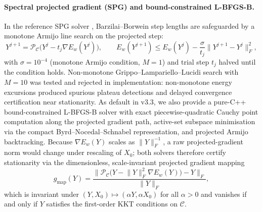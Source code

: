 \documentclass[11pt]{article}
\theoremstyle{definition}
\newcommand{\Fnorm}[1]{\lVert #1 \rVert_F}
\begin{document}
\paragraph{Spectral projected gradient (SPG) and bound-constrained L-BFGS-B.}
In the reference SPG solver \citep{birgin2000}, Barzilai--Borwein step lengths
\citep{barzilai1988} are safeguarded by a monotone Armijo line search on the projected step:
\begin{equation}\label{eq:spg_armijo}
  Y^{j+1} = \mathcal{P}_\mathcal{C}\!\big(Y^j - t_j \nabla E_w(Y^j)\big),
  \qquad
  E_w(Y^{j+1}) \le E_w(Y^j) - \frac{\sigma}{t_j}\Fnorm{Y^{j+1}-Y^j}^2 ,
\end{equation}
with $\sigma = 10^{-4}$ (monotone Armijo condition, $M=1$) and trial step $t_j$ halved until the condition
holds. Non-monotone Grippo--Lampariello--Lucidi search with $M=10$ was tested and rejected in implementation: non-monotone energy excursions produced spurious plateau detections and delayed convergence certification near stationarity. As default in v3.3, we also provide a pure-C++ bound-constrained
L-BFGS-B solver \citep{byrd1995limited} with exact piecewise-quadratic Cauchy
point computation along the projected gradient path, active-set subspace
minimisation via the compact Byrd--Nocedal--Schnabel representation, and
projected Armijo backtracking. Because $\nabla E_w(Y)$ scales as
$\Fnorm{Y}^{-1}$, a raw projected-gradient norm would change under rescaling of
$X_0$; both solvers therefore certify stationarity via the dimensionless,
scale-invariant projected gradient mapping
\begin{equation}\label{eq:gradmap}
  g_{\text{map}}(Y)
  = \frac{\Fnorm{\mathcal{P}_{\mathcal{C}}\!\big(Y - \Fnorm{Y}^2 \nabla E_w(Y)\big) - Y}}{\Fnorm{Y}} ,
\end{equation}
which is invariant under $(Y, X_0) \mapsto (\alpha Y, \alpha X_0)$ for all
$\alpha > 0$ and vanishes if and only if $Y$ satisfies the first-order KKT
conditions on $\mathcal{C}$.
\end{document}
